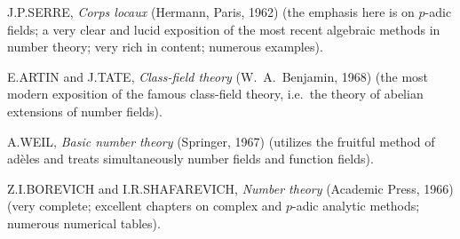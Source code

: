 J.\thinspace P.\thinspace SERRE, \emph{Corps locaux} (Hermann, Paris, 1962)
(the emphasis here is on $p$-adic fields; a very clear and lucid exposition
of the most recent algebraic methods in number theory; very rich in content;
numerous examples).

E.\thinspace ARTIN and J.\thinspace TATE, \emph{Class-field theory}
(W.\ A.\ Benjamin, 1968) (the most modern exposition of the famous
class-field theory, i.e.\ the theory of abelian extensions of number
fields).

A.\thinspace WEIL, \emph{Basic number theory} (Springer, 1967) (utilizes the
fruitful method of adèles and treats simultaneously number fields and
function fields).

Z.\thinspace I.\thinspace BOREVICH and I.\thinspace R.\thinspace SHAFAREVICH,
\emph{Number theory} (Academic Press, 1966) (very complete; excellent
chapters on complex and $p$-adic analytic methods; numerous numerical
tables).

\endgroup
\vspace{1.2\baselineskip}

